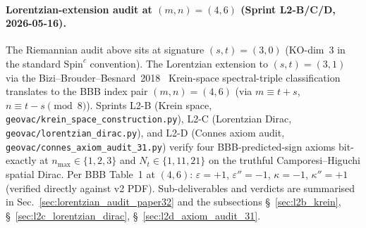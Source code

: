 \documentclass[11pt]{article}
\begin{document}
\paragraph{Lorentzian-extension audit at $(m, n) = (4, 6)$
(Sprint L2-B/C/D, 2026-05-16).}
The Riemannian audit above sits at signature $(s, t) = (3, 0)$
(KO-dim~$3$ in the standard $\mathrm{Spin}^c$ convention).  The
Lorentzian extension to $(s, t) = (3, 1)$ via the
Bizi--Brouder--Besnard~2018~\cite{bizi_brouder_besnard2018} Krein-space
spectral-triple classification translates to the BBB index pair
$(m, n) = (4, 6)$ (via $m \equiv t + s$, $n \equiv t - s \pmod 8$).
Sprints L2-B (Krein space, \texttt{geovac/krein\_space\_construction.py}),
L2-C (Lorentzian Dirac, \texttt{geovac/lorentzian\_dirac.py}), and L2-D
(Connes axiom audit, \texttt{geovac/connes\_axiom\_audit\_31.py})
verify four BBB-predicted-sign axioms bit-exactly at
$n_{\max} \in \{1, 2, 3\}$ and $N_t \in \{1, 11, 21\}$ on the truthful
Camporesi--Higuchi spatial Dirac.  Per BBB Table~1 at $(4, 6)$:
$\varepsilon = +1$, $\varepsilon'' = -1$, $\kappa = -1$, $\kappa'' = +1$
(verified directly against \cite{bizi_brouder_besnard2018} v2 PDF).
Sub-deliverables and verdicts are summarised in
Sec.~\ref{sec:lorentzian_audit_paper32} and the subsections
\S~\ref{sec:l2b_krein}, \S~\ref{sec:l2c_lorentzian_dirac},
\S~\ref{sec:l2d_axiom_audit_31}.
\end{document}
